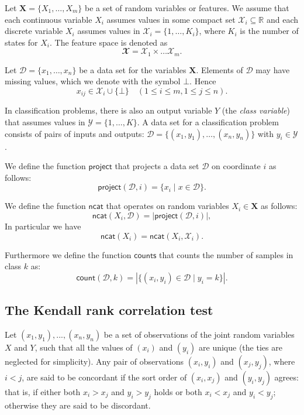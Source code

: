 \documentclass{article}
\newcommand{\func}[1]{\ensuremath{\textsf{#1}}} %
\newcommand{\set}[1]{\ensuremath{\{ #1 \} }} %
\begin{document}
Let $\mathbf{X} = \{ X_1, \ldots, X_m \}$ be a set of random variables or features. We assume that each continuous variable $X_i$ assumes values in some compact set $\mathcal{X}_i \subseteq \mathbb{R}$ and each
discrete variable $X_i$ assumes values in $\mathcal{X}_i = \{1, \ldots, K_i\}$, where $K_i$ is the number of states for $X_i$. The feature space is denoted as
\[
\mathbfcal{X} = \mathcal{X}_1 \times \ldots \mathcal{X}_m.
\]

Let $\mathcal{D} = \{ x_1, \ldots, x_n \}$ be a data set for the variables $\mathbf{X}$. Elements of $\mathcal{D}$ may have missing values, which we denote with the symbol $\bot$. Hence
\[
  x_{ij} \in \mathcal{X}_i \cup \{ \bot \} \quad (1 \leq i \leq m, 1 \leq j \leq n).
\]

In classification problems, there is also an output variable $Y$ (the \emph{class variable}) that assumes values in $\mathcal{Y} = \{ 1, \ldots, K \}$. A data set for a classification problem consists of pairs of inputs and outputs:
$\mathcal{D} = \{ (x_1, y_1), \ldots, (x_n, y_n) \}$ with $y_i \in \mathcal{Y}$.


\vspace{0.5cm}
\noindent
We define the function \func{project} that projects a data set $\mathcal{D}$ on coordinate $i$ as follows:
\[
\func{project}(\mathcal{D}, i) = \set{ x_{i} \mid x \in \mathcal{D}}.
\]

\vspace{0.5cm}
\noindent
We define the function \func{ncat} that operates on random variables $X_i \in \mathbf{X}$ as follows:
\[
\func{ncat}(X_i, \mathcal{D}) = |\func{project}(\mathcal{D}, i)|,
\]
In particular we have
\[
\func{ncat}(X_i) = \func{ncat}(X_i, \mathcal{X}_i).
\]

\vspace{0.5cm}
\noindent
Furthermore we define the function \func{counts} that counts the number of samples in class $k$ as:
\[
\func{count}(\mathcal{D}, k) = |\set{ (x_i,y_i) \in \mathcal{D} \mid y_i = k }|.
\]

\subsection{The Kendall rank correlation test}
Let $(x_{1},y_{1}),...,(x_{n},y_{n})$ be a set of observations of the joint random variables $X$ and $Y$, such that all the values of $(x_{i})$ and $(y_{i})$ are unique (the ties are neglected for simplicity). Any pair of observations $(x_{i},y_{i})$ and
$(x_{j},y_{j})$, where $i < j$, are said to be concordant if the sort order of
$(x_{i},x_{j})$ and $(y_{i},y_{j})$ agrees: that is, if either both $ x_{i}>x_{j}$ and $ y_{i}>y_{j}$ holds or both $x_{i}<x_{j}$ and $y_{i}<y_{j}$; otherwise they are said to be discordant.
\end{document}
